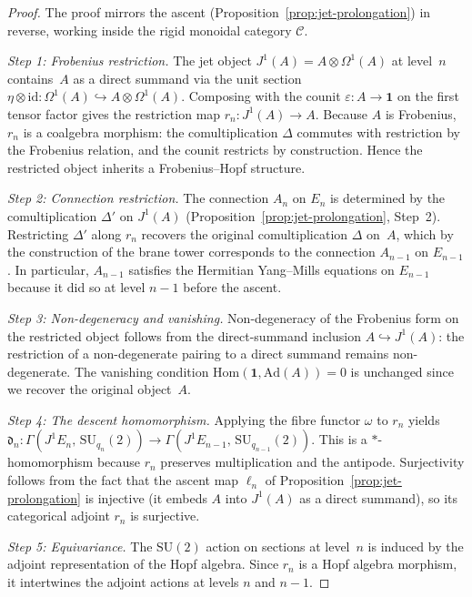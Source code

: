 \begin{proof}
The proof mirrors the ascent (Proposition~\ref{prop:jet-prolongation}) in
reverse, working inside the rigid monoidal category $\mathcal{C}$.

\emph{Step 1: Frobenius restriction.}\;
The jet object $J^1(A) = A \otimes \Omega^1(A)$ at level~$n$ contains~$A$
as a direct summand via the unit section
$\eta \otimes \mathrm{id}\colon \Omega^1(A) \hookrightarrow A \otimes
\Omega^1(A)$.  Composing with the counit $\varepsilon\colon A \to \mathbf{1}$
on the first tensor factor gives the restriction map
$r_n\colon J^1(A) \to A$.  Because $A$ is Frobenius, $r_n$ is a coalgebra
morphism: the comultiplication $\Delta$ commutes with restriction by the
Frobenius relation, and the counit restricts by construction.  Hence the
restricted object inherits a Frobenius--Hopf structure.

\emph{Step 2: Connection restriction.}\;
The connection $A_n$ on $E_n$ is determined by the comultiplication
$\Delta'$ on $J^1(A)$ (Proposition~\ref{prop:jet-prolongation}, Step~2).
Restricting $\Delta'$ along $r_n$ recovers the original comultiplication
$\Delta$ on~$A$, which by the construction of the brane tower corresponds to
the connection $A_{n-1}$ on $E_{n-1}$.  In particular, $A_{n-1}$ satisfies
the Hermitian Yang--Mills equations on $E_{n-1}$ because it did so at level
$n{-}1$ before the ascent.

\emph{Step 3: Non-degeneracy and vanishing.}\;
Non-degeneracy of the Frobenius form on the restricted object follows from
the direct-summand inclusion $A \hookrightarrow J^1(A)$: the restriction of a
non-degenerate pairing to a direct summand remains non-degenerate.  The
vanishing condition $\mathrm{Hom}(\mathbf{1}, \mathrm{Ad}(A)) = 0$ is
unchanged since we recover the original object~$A$.

\emph{Step 4: The descent homomorphism.}\;
Applying the fibre functor $\omega$ to $r_n$ yields
$\mathfrak{d}_n\colon
\Gamma(J^1 E_n,\, \mathrm{SU}_{q_n}(2)) \to
\Gamma(J^1 E_{n-1},\, \mathrm{SU}_{q_{n-1}}(2))$.
This is a $*$-homomorphism because $r_n$ preserves multiplication and
the antipode.  Surjectivity follows from the fact that the ascent map
$\ell_n$ of Proposition~\ref{prop:jet-prolongation} is injective (it
embeds $A$ into $J^1(A)$ as a direct summand), so its categorical adjoint
$r_n$ is surjective.

\emph{Step 5: Equivariance.}\;
The $\mathrm{SU}(2)$ action on sections at level~$n$ is induced by the
adjoint representation of the Hopf algebra.  Since $r_n$ is a Hopf algebra
morphism, it intertwines the adjoint actions at levels $n$ and $n{-}1$.
\end{proof}

